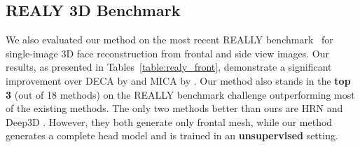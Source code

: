 \documentclass[10pt,twocolumn,letterpaper]{article}
\begin{document}
\begin{table}[h]
\centering
\caption{Reconstruction error on the NoW Benchmark.}
\vspace{-2mm}
\fontsize{8}{7}
\small
{}
\end{table}


\subsection{REALY 3D Benchmark}

We also evaluated our method on the most recent REALLY benchmark~\cite{REALY} for single-image 3D face reconstruction from frontal and side view images.  Our results, as presented in Tables~\ref{table:realy_front}, demonstrate a significant improvement over DECA by  and MICA by . Our method also stands in the \textbf{top 3} (out of 18 methods) on the REALLY benchmark challenge outperforming most of the existing methods. The only two methods better than ours are HRN \cite{HRN} and Deep3D \cite{deep3d_rebuttal}.  However, they both generate only frontal mesh, while our method generates a complete head model and is trained in an {\bf unsupervised} setting.
\end{document}
